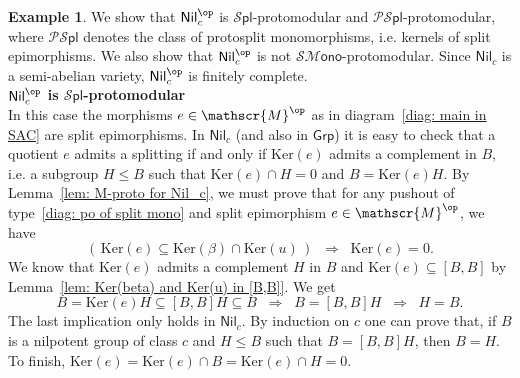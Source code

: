\documentclass[10pt,a4paper]{amsart}
\theoremstyle{plain}
\theoremstyle{definition}
\newtheorem{example}[subsection]{Example}
\theoremstyle{remark}
\newcommand{\To}{\Rightarrow}
\newcommand{\Grp}{\ensuremath{\mathsf{Grp}}}
\newcommand{\Nil}{\ensuremath{\mathsf{Nil}}}
\newcommand{\M}{\ensuremath{\mathscr{M}}}
\newcommand{\SMono}{\ensuremath{\mathscr{SM}\mathsf{ono}}}
\newcommand{\Spl}{\ensuremath{\mathscr{S}\mathsf{pl}}}
\newcommand{\PSpl}{\ensuremath{\mathscr{PS}\mathsf{pl}}}
\newcommand{\Ker}{\ensuremath{\mathrm{Ker}}}
\begin{document}
\begin{example}\label{ex: Nil_c^op} We show that $\Nil_c^\op$ is $\Spl$-protomodular and $\PSpl$-protomodular, where $\PSpl$ denotes the class of protosplit monomorphisms, i.e. kernels of split epimorphisms. We also show that $\Nil_c^\op$ is not $\SMono$-protomodular. Since $\Nil_c$ is a semi-abelian variety, $\Nil_c^\op$ is finitely complete.\\
\noindent\textbf{$\Nil_c^\op$ is $\Spl$-protomodular}\\
In this case the morphisms $e\in\M^\op$ as in diagram~\eqref{diag: main in SAC} are split epimorphisms. In $\Nil_c$ (and also in $\Grp$) it is easy to check that a quotient $e$ admits a splitting if and only if $\Ker(e)$ admits a complement in $B$, i.e. a subgroup $H\le B$ such that $\Ker(e)\cap H=0$ and $B=\Ker(e)H$.  By Lemma~\ref{lem: M-proto for Nil_c}, we must prove that for any pushout of type~\eqref{diag: po of split mono} and split epimorphism $e\in \M^\op$, we have
\[
	\left( \,\Ker(e) \subseteq \Ker(\beta)\cap \Ker(u) \,\right) \;\;\To\;\; \Ker(e)=0.
\]
We know that $\Ker(e)$ admits a complement $H$ in $B$ and $\Ker(e) \subseteq [B,B]$ by Lemma~\ref{lem: Ker(beta) and Ker(u) in [B,B]}. We get
\[
	B=\Ker(e)H\subseteq [B,B]H\subseteq B \;\; \To\;\; B=[B,B]H \;\; \To\;\; H=B.
\]
The last implication only holds in $\Nil_c$. By induction on $c$ one can prove that, if $B$ is a nilpotent group of class $c$ and $H\le B$ such that $B=[B,B]H$, then $B=H$. To finish, $\Ker(e)=\Ker(e)\cap B=\Ker(e)\cap H=0$.


\end{example}
\end{document}
